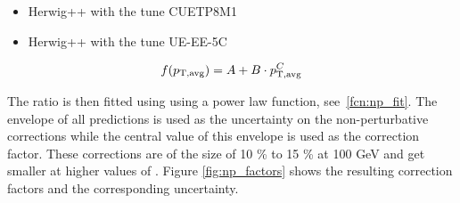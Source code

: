 \begin{itemize}
    \item Herwig++ with the tune CUETP8M1
    \item Herwig++ with the tune UE-EE-5C
\end{itemize}

\begin{equation}
  f(p_{\mathrm{T,avg}}) = A + B \cdot p_{\mathrm{T,avg}}^C
  \label{fcn:np_fit}
\end{equation}

The ratio is then fitted using  using a power law function,
see~\ref{fcn:np_fit}.  The envelope of all predictions is used as the
uncertainty on the non-perturbative corrections while the central value of this
envelope is used as the correction factor.  These corrections are of the size of
10 \% to 15 \% at 100 \si{GeV} and get smaller at higher values of \ptavg. Figure
\ref{fig:np_factors} shows the resulting correction factors and the
corresponding uncertainty.

